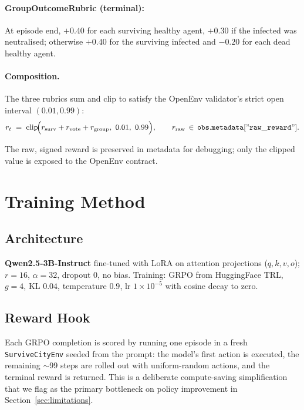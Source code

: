 \documentclass[11pt,a4paper]{article}
\begin{document}
\paragraph{GroupOutcomeRubric (terminal):}
At episode end, $+0.40$ for each surviving healthy agent, $+0.30$ if the
infected was neutralised; otherwise $+0.40$ for the surviving infected and
$-0.20$ for each dead healthy agent.

\paragraph{Composition.} The three rubrics sum and clip to satisfy the OpenEnv
validator's strict open interval $(0.01, 0.99)$:
\[
r_t \;=\; \mathrm{clip}\!\Bigl(r_{\text{surv}} + r_{\text{vote}} + r_{\text{group}},\ 0.01,\ 0.99\Bigr),
\qquad r_{\text{raw}}\,\in\,\mathtt{obs.metadata["raw\_reward"]}.
\]

The raw, signed reward is preserved in metadata for debugging; only the clipped
value is exposed to the OpenEnv contract.

\section{Training Method}
\label{sec:method}

\subsection{Architecture}
\textbf{Qwen2.5-3B-Instruct} \cite{qwen2024} fine-tuned with LoRA
\cite{hu2022lora} on attention projections ($q,k,v,o$); $r{=}16$, $\alpha{=}32$,
dropout $0$, no bias. Training: GRPO \cite{deepseekr1} from HuggingFace
TRL, $g{=}4$, KL $0.04$, temperature $0.9$, lr $1\!\times\!10^{-5}$ with cosine
decay to zero.

\subsection{Reward Hook}
Each GRPO completion is scored by running one episode in a fresh
\texttt{SurviveCityEnv} seeded from the prompt: the model's first action is
executed, the remaining $\sim$99 steps are rolled out with uniform-random
actions, and the terminal reward is returned. This is a deliberate
compute-saving simplification that we flag as the primary bottleneck on policy
improvement in Section~\ref{sec:limitations}.
\end{document}
